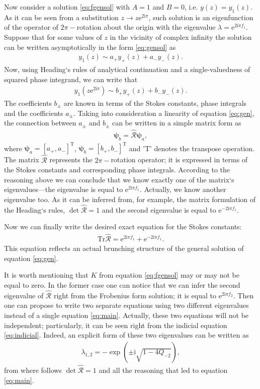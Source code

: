 \documentclass[aip,jmp,reprint]{revtex4-1}
\def\rmi{\mathrm{i}}
\def\rme{\mathrm{e}}
\def\R{\widehat{\mathcal{R}}}
\def\psii{\bm\psi}
\def\T{\mathrm{T}}
\def\Tr{\mathrm{Tr}}
\begin{document}
Now consider a solution \eqref{eq:fgensol} with $A=1$ and $B=0$, i.e. $y(z)=y_1(z)$. 
As it can be seen from a substitution \mbox{$z \rightarrow z \rme^{2 \rmi \pi}$}, 
such solution is an eigenfunction of the operator of
$2\pi-$rotation about the origin with the eigenvalue $\lambda = \rme^{2 \rmi \pi f_1}$.  
Suppose that for some values of $z$ in the vicinity of complex infinity 
the solution can be written asymptotically in the form \eqref{eq:gensol} as
\begin{eqnarray}
y_1(z) \sim a_+y_+(z) + a_-y_-(z).
\end{eqnarray}
Now, using Heading`s rules of analytical continuation and a single-valuedness of squared phase integrand,
we can write that
\begin{eqnarray}
y_1(z \rme^{2 \rmi \pi}) \sim b_+y_+(z) + b_-y_-(z).
\end{eqnarray}
The coefficients $b_{\pm}$ are known in terms of the Stokes constants, phase integrals and 
the coefficients $a_{\pm}$.
Taking into consideration a linearity of equation \eqref{eq:gen}, the connection between $a_{\pm}$
and $b_{\pm}$ can be written in a simple matrix form as
\begin{eqnarray}
\psii_b = \R \psii_a,
\end{eqnarray}
where $\psii_a = [{a_+,a_-}]^{\T}$, $\psii_b = [{b_+,b_-}]^{\T}$ and 'T' denotes the transpose operation.
The matrix $\R$ represents the $2\pi-$rotation operator; it is expressed in terms of
the Stokes constants and corresponding phase integrals. According to the reasoning above we can conclude
that we know exactly one of the matrix`s eigenvalues---the eigenvalue is equal to $\rme^{2 \rmi \pi f_1}$.
Actually, we know another eigenvalue too. As it can be inferred from, for example, the matrix formulation 
of the Heading`s rules, $\det\R=1$ and the second eigenvalue is equal to $\rme^{-2 \rmi \pi f_1}$.

Now we can finally write the desired exact equation for the Stokes constants:
\begin{eqnarray}
\Tr\R = \rme^{2 \rmi \pi f_1} + \rme^{-2 \rmi \pi f_1}.
\label{eq:main}
\end{eqnarray}
This equation reflects an actual brunching structure of the general solution of equation \eqref{eq:gen}.

It is worth mentioning that $K$ from equation \eqref{eq:fgensol} may or may not be equal to zero. In the
former case one can notice that we can infer the second eigenvalue of $\R$ right from the
Frobenius form solution; it is equal to $\rme^{2 \rmi \pi f_2}$. Then one can propose to write two
separate equations using two different eigenvalues instead of a single equation \eqref{eq:main}.
Actually, these two equations will not be independent; particularly, it can be seen right from the
indicial equation \eqref{eq:indicial}. Indeed, an explicit form of these two eigenvalues
can be written as
\begin{eqnarray}
\lambda_{1,2} = - \exp(\pm \rmi \sqrt{1 - 4 Q_{-2}}),
\end{eqnarray}
from where follows $\det\R=1$ and all the reasoning that led to equation \eqref{eq:main}.
\end{document}
